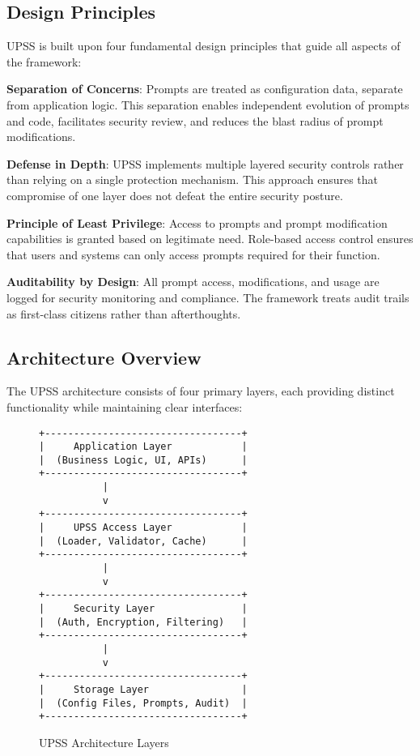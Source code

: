 \subsection{Design Principles}

UPSS is built upon four fundamental design principles that guide all aspects of the framework:

\textbf{Separation of Concerns}: Prompts are treated as configuration data, separate from application logic. This separation enables independent evolution of prompts and code, facilitates security review, and reduces the blast radius of prompt modifications.

\textbf{Defense in Depth}: UPSS implements multiple layered security controls rather than relying on a single protection mechanism. This approach ensures that compromise of one layer does not defeat the entire security posture.

\textbf{Principle of Least Privilege}: Access to prompts and prompt modification capabilities is granted based on legitimate need. Role-based access control ensures that users and systems can only access prompts required for their function.

\textbf{Auditability by Design}: All prompt access, modifications, and usage are logged for security monitoring and compliance. The framework treats audit trails as first-class citizens rather than afterthoughts.

\subsection{Architecture Overview}

The UPSS architecture consists of four primary layers, each providing distinct functionality while maintaining clear interfaces:

\begin{figure}[h]
\centering
\begin{verbatim}
+----------------------------------+
|     Application Layer            |
|  (Business Logic, UI, APIs)      |
+----------------------------------+
           |
           v
+----------------------------------+
|     UPSS Access Layer            |
|  (Loader, Validator, Cache)      |
+----------------------------------+
           |
           v
+----------------------------------+
|     Security Layer               |
|  (Auth, Encryption, Filtering)   |
+----------------------------------+
           |
           v
+----------------------------------+
|     Storage Layer                |
|  (Config Files, Prompts, Audit)  |
+----------------------------------+
\end{verbatim}
\caption{UPSS Architecture Layers}
\label{fig:architecture}
\end{figure}

